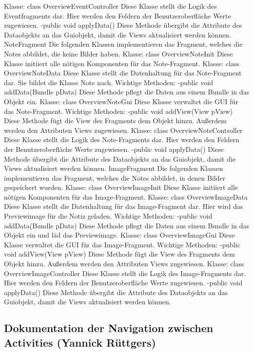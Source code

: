 Klasse: class OverviewEventController
Diese Klasse stellt die Logik des Eventfragments dar. Hier werden den Feldern der Benutzeroberfläche Werte zugewiesen.
-public void applyData()
Diese Methode übergibt die Attribute des Dataobjekts an das Guiobjekt, damit die Views aktualisiert werden können.
NoteFragment
Die folgenden Klassen implementieren das Fragment, welches die Notes abbildet, die keine Bilder haben.
Klasse: class OverviewNoteInit
Diese Klasse initiiert alle nötigen Komponenten für das Note-Fragment.
Klasse: class OverviewNoteData
Diese Klasse stellt die Datenhaltung für das Note-Fragment dar. Sie bildet die Klasse Note nach.
Wichtige Methoden:
-public void addData(Bundle pData)
Diese Methode pflegt die Daten aus einem Bundle in das Objekt ein.
Klasse: class OverviewNoteGui
Diese Klasse verwaltet die GUI für das Note-Fragment.
Wichtige Methoden:
-public void addView(View pView)
Diese Methode fügt die View des Fragments dem Objekt hinzu. Außerdem werden den Attributen Views zugewiesen.
Klasse: class OverviewNoteController
Diese Klasse stellt die Logik des Note-Fragments dar. Hier werden den Feldern der Benutzeroberfläche Werte zugewiesen.
-public void applyData()
Diese Methode übergibt die Attribute des Dataobjekts an das Guiobjekt, damit die Views aktualisiert werden können.
ImageFragment
Die folgenden Klassen implementieren das Fragment, welches die Notes abbildet, in denen Bilder gespeichert wurden.
Klasse: class OverviewImageInit
Diese Klasse initiiert alle nötigen Komponenten für das Image-Fragment.
Klasse: class OverviewImageData
Diese Klasse stellt die Datenhaltung für das Image-Fragment dar. Hier wird das Previewimage für die Notiz geladen.
Wichtige Methoden:
-public void addData(Bundle pData)
Diese Methode pflegt die Daten aus einem Bundle in das Objekt ein und läd das Previewimage.
Klasse: class OverviewImageGui
Diese Klasse verwaltet die GUI für das Image-Fragment.
Wichtige Methoden:
-public void addView(View pView)
Diese Methode fügt die View des Fragments dem Objekt hinzu. Außerdem werden den Attributen Views zugewiesen.
Klasse: class OverviewImageController
Diese Klasse stellt die Logik des Image-Fragments dar. Hier werden den Feldern der Benutzeroberfläche Werte zugewiesen.
-public void applyData()
Diese Methode übergibt die Attribute des Dataobjekts an das Guiobjekt, damit die Views aktualisiert werden können.


\subsection{Dokumentation der Navigation zwischen Activities (Yannick Rüttgers)}

